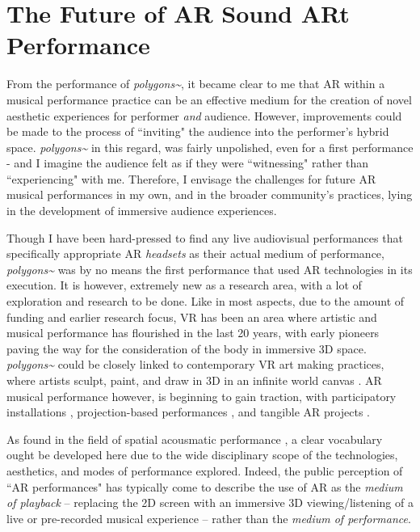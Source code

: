 \section{The Future of AR Sound ARt Performance}
From the performance of \textit{polygons\textasciitilde{}}, it became clear to me that AR within a musical performance practice can be an effective medium for the creation of novel aesthetic experiences for performer \textit{and} audience. However, improvements could be made to the process of ``inviting" the audience into the performer's hybrid space. \textit{polygons\textasciitilde{}} in this regard, was fairly unpolished, even for a first performance - and I imagine the audience felt as if they were ``witnessing" rather than ``experiencing" with me. Therefore, I envisage the challenges for future AR musical performances in my own, and in the broader community's practices, lying in the development of immersive audience experiences.

Though I have been hard-pressed to find any live audiovisual performances that specifically appropriate AR \textit{headsets} as their actual medium of performance, \textit{polygons\textasciitilde{}} was by no means the first performance that used AR technologies in its execution. It is however, extremely new as a research area, with a lot of exploration and research to be done. Like in most aspects, due to the amount of funding and earlier research focus, VR has been an area where artistic and musical performance has flourished in the last 20 years, with early pioneers \citep{davies2004} paving the way for the consideration of the body in immersive 3D space. \textit{polygons\textasciitilde{}} could be closely linked to contemporary VR art making practices, where artists sculpt, paint, and draw in 3D in an infinite world canvas \citep{summers2019}. AR musical performance however, is beginning to gain traction, with participatory installations \citep{chevalier2018},  projection-based performances \citep{quay2016,berthaut2016,robinson2020}, and tangible AR projects \cite{zamborlin2018}. 

As found in the field of spatial acousmatic performance \citep{sharma2015}, a clear vocabulary ought be developed here due to the wide disciplinary scope of the technologies, aesthetics, and modes of performance explored. Indeed, the public perception of ``AR performances" has typically come to describe the use of AR as the \textit{medium of playback} -- replacing the 2D screen with an immersive 3D viewing/listening of a live or pre-recorded musical experience -- rather than the \textit{medium of performance}.

